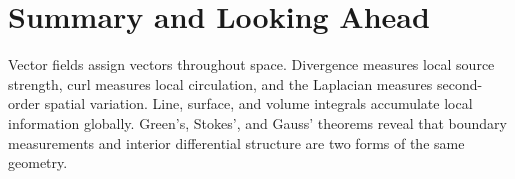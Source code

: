 \section{Summary and Looking Ahead}
Vector fields assign vectors throughout space. Divergence measures local source strength, curl measures local circulation, and the Laplacian measures second-order spatial variation. Line, surface, and volume integrals accumulate local information globally. Green's, Stokes', and Gauss' theorems reveal that boundary measurements and interior differential structure are two forms of the same geometry.
